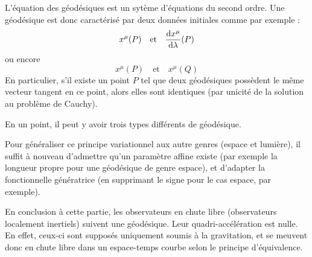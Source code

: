 \cutebreak
\begin{rmk}
    L'équation des géodésiques est un sytème d'équations du second ordre. Une géodésique est donc caractérisé par deux données initiales comme par exemple :
    \begin{equation}
        x^\mu(P) \quad \text{et} \quad \frac{\mathrm{d} x^\mu}{\mathrm{d} \lambda} (P)
    \end{equation}
    ou encore
    \begin{equation}
        x^\mu(P) \quad \text{et} \quad x^\mu(Q)
    \end{equation}
    En particulier, s'il existe un point $P$ tel que deux géodésiques possèdent le même vecteur tangent en ce point, alors elles sont identiques (par unicité de la solution au problème de Cauchy). 
\end{rmk}
\cutebreak
\begin{rmk}
    En un point, il peut y avoir trois types différents de géodésique.
\end{rmk}
\cutebreak
\begin{rmk}
    Pour généraliser ce principe variationnel aux autre genres (espace et lumière), il suffit à nouveau d'admettre qu'un paramètre affine existe (par exemple la longueur propre pour une géodésique de genre espace), et d'adapter la fonctionnelle génératrice (en supprimant le signe pour le cas espace, par exemple).
\end{rmk}
En conclusion à cette partie, les observateurs en chute libre (observateurs localement inertiels) suivent une géodésique. Leur quadri-accélération est nulle. En effet, ceux-ci sont supposés uniquement soumis à la gravitation, et se meuvent donc en chute libre dans un espace-temps courbe selon le principe d'équivalence.

